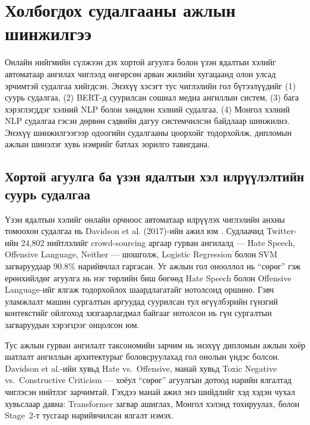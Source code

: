 
\section{Холбогдох судалгааны ажлын шинжилгээ}
\label{sec:related-work}

Онлайн нийгмийн сүлжээн дэх хортой агуулга болон үзэн ядалтын хэлийг
автоматаар ангилах чиглэлд өнгөрсөн арван жилийн хугацаанд олон улсад эрчимтэй
судалгаа хийгдсэн. Энэхүү хэсэгт тус чиглэлийн гол бүтээлүүдийг (1) суурь
судалгаа, (2) BERT-д суурилсан сошиал медиа ангиллын систем, (3) бага
хэрэглэгддэг хэлний NLP болон хөндлөн хэлний судалгаа, (4) Монгол хэлний NLP
судалгаа гэсэн дөрвөн сэдвийн дагуу системчилсэн байдлаар шинжилнэ. Энэхүү
шинжилгээгээр одоогийн судалгааны цоорхойг тодорхойлж, дипломын ажлын шинэлэг
хувь нэмрийг батлах зорилго тавигдана.

\subsection{Хортой агуулга ба үзэн ядалтын хэл илрүүлэлтийн суурь судалгаа}

Үзэн ядалтын хэлийг онлайн орчноос автоматаар илрүүлэх чиглэлийн анхны
томоохон судалгаа нь Davidson et al. (2017)-ийн ажил юм \cite{davidson2017}.
Судлаачид Twitter-ийн 24,802 нийтлэлийг crowd-sourcing аргаар гурван ангилалд
--- Hate Speech, Offensive Language, Neither --- шошголж, Logistic Regression
болон SVM загваруудаар $90.8\%$ нарийвчлал гаргасан. Уг ажлын гол онооллол нь
``сөрөг'' гэж ерөнхийлдөг агуулга нь нэг төрлийн биш бөгөөд Hate Speech болон
Offensive Language-ийг ялгаж тодорхойлох шаардлагатайг нотолсонд оршино.
Гэвч уламжлалт машин сургалтын аргуудад суурилсан тул өгүүлбэрийн гүнзгий
контекстийг ойлгоход хязгаарлагдмал байгааг нотолсон нь гүн сургалтын
загваруудын хэрэгцээг онцолсон юм.

Тус ажлын гурван ангилалт таксономийн зарчим нь энэхүү дипломын ажлын хоёр
шатлалт ангиллын архитектурыг боловсруулахад гол онолын үндэс болсон.
Davidson et al.-ийн хувьд Hate vs.\ Offensive, манай хувьд Toxic Negative
vs.\ Constructive Criticism --- хоёул ``сөрөг'' агуулгын дотоод нарийн ялгалтад
чиглэсэн нийтлэг зарчимтай. Гэхдээ манай ажил энэ шийдлийг хэд хэдэн чухал
хувьслаар давна: Transformer загвар ашиглах, Монгол хэлэнд тохируулах, болон
Stage~2-т тусгаар нарийвчилсан ялгалт нэмэх.

